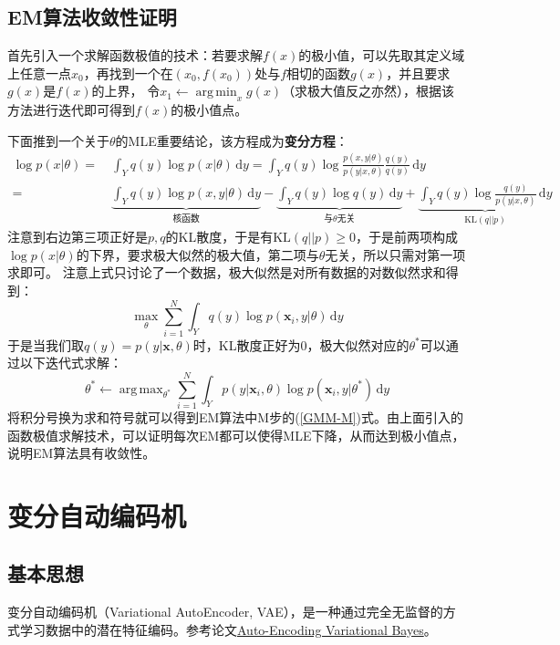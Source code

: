 \documentclass[12pt, a4paper, oneside]{ctexart}
\DeclareMathOperator*{\argmax}{arg\,max}  %
\DeclareMathOperator*{\argmin}{arg\,min}  %
\let\geq=\geqslant %
\def\bd{\boldsymbol}        %
\def\d{\mathrm{d}}          %
\begin{document}
\subsection{EM算法收敛性证明}
首先引入一个求解函数极值的技术：若要求解$f(x)$的极小值，可以先取其定义域上任意一点$x_0$，再找到一个在$(x_0,f(x_0))$处与$f$相切的函数$g(x)$，并且要求$g(x)$是$f(x)$的上界，
令$x_1\gets \argmin_{x}g(x)$（求极大值反之亦然），根据该方法进行迭代即可得到$f(x)$的极小值点。

下面推到一个关于$\theta$的MLE重要结论，该方程成为\textbf{变分方程}：
\begin{align}
\label{eq-var}\log p(x|\theta) =&\ \int_Yq(y)\log p(x|\theta)\,\mathrm{d}y = \int_Yq(y)\log\frac{p(x,y|\theta)}{p(y|x,\theta)}\frac{q(y)}{q(y)}\,\mathrm{d}y\\
\nonumber =&\ \underbrace{\int_Yq(y)\log p(x,y|\theta)\,\mathrm{d}y}_{\text{核函数}} - \underbrace{\int_Yq(y)\log q(y)\,\mathrm{d}y}_{\text{与}\theta\text{无关}} + \underbrace{\int_Y q(y)\log\frac{q(y)}{p(y|x,\theta)}\,\mathrm{d}y}_{\text{KL}(q||p)}
\end{align}
注意到右边第三项正好是$p,q$的KL散度，于是有$\text{KL}(q||p) \geq 0$，于是前两项构成$\log p(x|\theta)$的下界，要求极大似然的极大值，第二项与$\theta$无关，所以只需对第一项求即可。
注意上式只讨论了一个数据，极大似然是对所有数据的对数似然求和得到：
\begin{equation*}
    \max_{\theta}\sum_{i=1}^N\int_Yq(y)\log p(\bd{x}_i,y|\theta)\,\d y
\end{equation*}
于是当我们取$q(y) = p(y|\bd{x},\theta)$时，KL散度正好为$0$，极大似然对应的$\theta^*$可以通过以下迭代式求解：
\begin{equation*}
    \theta^*\gets\argmax_{\theta^*}\sum_{i=1}^N\int_Yp(y|\bd{x}_i,\theta)\log p(\bd{x}_i,y|\theta^*)\,\d y
\end{equation*}
将积分号换为求和符号就可以得到EM算法中M步的(\ref{GMM-M})式。由上面引入的函数极值求解技术，可以证明每次EM都可以使得MLE下降，从而达到极小值点，说明EM算法具有收敛性。
\section{变分自动编码机}
\subsection{基本思想}
变分自动编码机（Variational AutoEncoder, VAE），是一种通过完全无监督的方式学习数据中的潜在特征编码。参考论文\href{https://arxiv.org/pdf/1312.6114.pdf}{Auto-Encoding Variational Bayes}。
\end{document}
